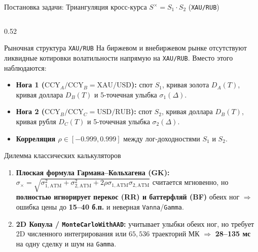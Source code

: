\documentclass[aspectratio=169, 9pt]{beamer}
\begin{document}
\begin{frame}{Постановка задачи: Триангуляция кросс-курса $S^\times = S_1 \cdot S_2$ (\texttt{XAU/RUB})}
  \begin{columns}[T]
    \begin{column}{0.52\textwidth}
      \begin{block}{Рыночная структура \texttt{XAU/RUB}}
        На биржевом и внебиржевом рынке отсутствуют ликвидные котировки волатильности напрямую на \texttt{XAU/RUB}. Вместо этого наблюдаются:
        \begin{itemize}
          \item \textbf{Нога 1 ($\text{CCY}_A / \text{CCY}_B = \text{XAU/USD}$):} спот $S_1$, кривая золота $D_A(T)$, кривая доллара $D_B(T)$ и 5-точечная улыбка $\sigma_1(\Delta)$.
          \item \textbf{Нога 2 ($\text{CCY}_B / \text{CCY}_C = \text{USD/RUB}$):} спот $S_2$, кривая доллара $D_B(T)$, кривая рубля $D_C(T)$ и 5-точечная улыбка $\sigma_2(\Delta)$.
          \item \textbf{Корреляция $\rho \in [-0.999, 0.999]$} между лог-доходностями $S_1$ и $S_2$.
        \end{itemize}
      \end{block}

      \begin{alertblock}{Дилемма классических калькуляторов}
        \begin{enumerate}
          \item \textbf{Плоская формула Гармана--Кольхагена (GK):}
            $\sigma_\times = \sqrt{\sigma_{1,\text{ATM}}^2 + \sigma_{2,\text{ATM}}^2 + 2\rho\sigma_{1,\text{ATM}}\sigma_{2,\text{ATM}}}$
            считается мгновенно, но \textbf{полностью игнорирует перекос (RR) и баттерфляй (BF)} обеих ног $\Rightarrow$ ошибка цены до \textbf{15--40 б.п.} и неверная \texttt{Vanna}/\texttt{Gamma}.
          \item \textbf{2D Копула / \texttt{MonteCarloWithAAD}:} учитывает улыбки обеих ног, но требует 2D численного интегрирования или $65,536$ траекторий МК $\Rightarrow$ \textbf{28--135 мс} на одну сделку и шум на \texttt{Gamma}.
        \end{enumerate}
      \end{alertblock}
    \end{column}


\end{columns}
\end{frame}
\end{document}

